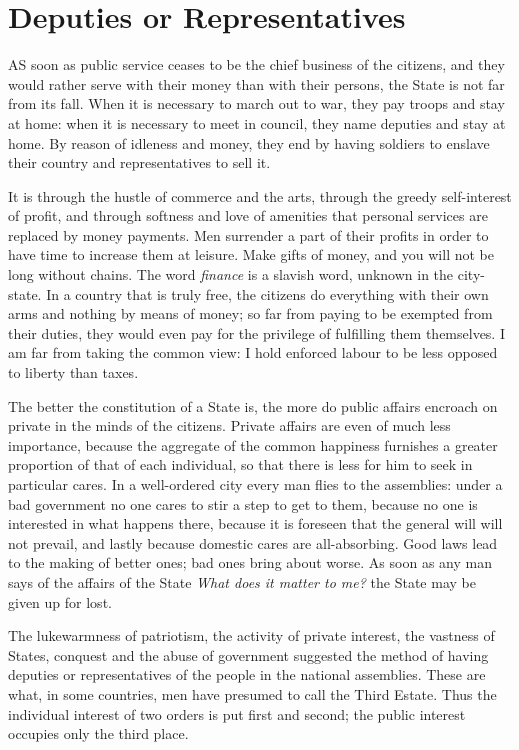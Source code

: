 \documentclass[12pt]{book}
\begin{document}
\section{Deputies or Representatives}
AS soon as public service ceases to be the chief business of the citizens, and they would rather serve with their money than with their persons, the State is not far from its fall. When it is necessary to march out to war, they pay troops and stay at home: when it is necessary to meet in council, they name deputies and stay at home. By reason of idleness and money, they end by having soldiers to enslave their country and representatives to sell it.

It is through the hustle of commerce and the arts, through the greedy self-interest of profit, and through softness and love of amenities that personal services are replaced by money payments. Men surrender a part of their profits in order to have time to increase them at leisure. Make gifts of money, and you will not be long without chains. The word \textit{finance} is a slavish word, unknown in the city-state. In a country that is truly free, the citizens do everything with their own arms and nothing by means of money; so far from paying to be exempted from their duties, they would even pay for the privilege of fulfilling them themselves. I am far from taking the common view: I hold enforced labour to be less opposed to liberty than taxes.

The better the constitution of a State is, the more do public affairs encroach on private in the minds of the citizens. Private affairs are even of much less importance, because the aggregate of the common happiness furnishes a greater proportion of that of each individual, so that there is less for him to seek in particular cares. In a well-ordered city every man flies to the assemblies: under a bad government no one cares to stir a step to get to them, because no one is interested in what happens there, because it is foreseen that the general will will not prevail, and lastly because domestic cares are all-absorbing. Good laws lead to the making of better ones; bad ones bring about worse. As soon as any man says of the affairs of the State \textit{What does it matter to me?} the State may be given up for lost.

The lukewarmness of patriotism, the activity of private interest, the vastness of States, conquest and the abuse of government suggested the method of having deputies or representatives of the people in the national assemblies. These are what, in some countries, men have presumed to call the Third Estate. Thus the individual interest of two orders is put first and second; the public interest occupies only the third place.
\end{document}
